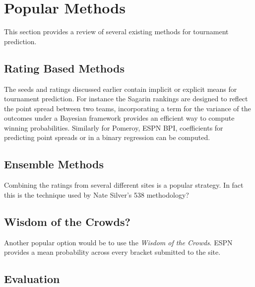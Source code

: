 \section{Popular Methods}  This section provides a review of several existing methods for tournament prediction.
\subsection{Rating Based Methods} 
The seeds and ratings discussed earlier contain implicit or explicit means for tournament prediction.  For instance the Sagarin rankings are designed to reflect the point spread between two teams, incorporating a term for the variance of the outcomes under a Bayesian framework provides an efficient way to compute winning probabilities.  Similarly for Pomeroy, ESPN BPI, coefficients for predicting point spreads or in a binary regression can be computed.
\subsection{Ensemble Methods}
Combining the ratings from several different sites is a popular strategy.  In fact this is the technique used by Nate Silver's 538 methodology?
\subsection{Wisdom of the Crowds?}
Another popular option would be to use the \emph{Wisdom of the Crowds}.  ESPN provides a mean probability across every bracket submitted to the site.

\subsection{Evaluation}

